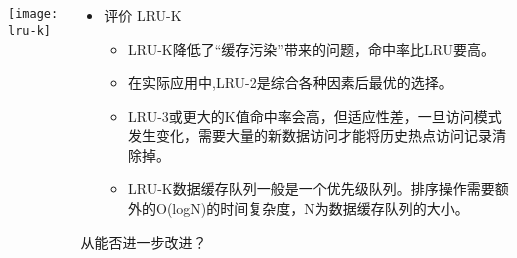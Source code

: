\begin{frame}[plain]
	\frametitle{ }
	\begin{columns}
		\begin{column}{.4\textwidth}
			\centering
			\texttt{[image: lru-k]}
		\end{column}
		
		\begin{column}{.6\textwidth}
			
			\begin{itemize}
				\item 评价 LRU-K 
				\begin{itemize}
					
					\item LRU-K降低了“缓存污染”带来的问题，命中率比LRU要高。
					\item 在实际应用中,LRU-2是综合各种因素后最优的选择。
					\item LRU-3或更大的K值命中率会高，但适应性差，一旦访问模式发生变化，需要大量的新数据访问才能将历史热点访问记录清除掉。
					\item LRU-K数据缓存队列一般是一个优先级队列。排序操作需要额外的O(logN)的时间复杂度，N为数据缓存队列的大小。
				\end{itemize}
			\end{itemize}
			\centering
			\large 从能否进一步改进？
		\end{column}
		
		
	\end{columns}
\end{frame}



